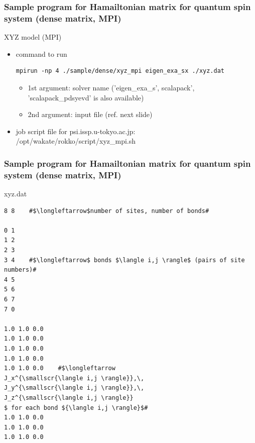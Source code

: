 \lstset{escapechar=\#}
  

\begin{frame}[c,fragile]
  \frametitle{Sample program for Hamailtonian matrix for quantum spin system (dense matrix, MPI)}

XYZ model (MPI) 
  \begin{itemize}
  \item command to run
\begin{lstlisting}[style=shstyle]
mpirun -np 4 ./sample/dense/xyz_mpi eigen_exa_sx ./xyz.dat
\end{lstlisting}
    \begin{itemize}
    \item 1st argument: solver name ('eigen_exa_s', scalapack', 'scalapack_pdsyevd' is also available) \\
    \item 2nd argument: input file (ref. next slide)
    \end{itemize}
  \item job script file for psi.issp.u-tokyo.ac.jp:  /opt/wakate/rokko/script/xyz_mpi.sh
  \end{itemize}
\end{frame}


\begin{frame}[c,fragile]
  \frametitle{Sample program for Hamailtonian matrix for quantum spin system (dense matrix, MPI)}
xyz.dat
\begin{lstlisting}[style=shstyle]
8 8    #$\longleftarrow$number of sites, number of bonds#

0 1
1 2
2 3
3 4    #$\longleftarrow$ bonds $\langle i,j \rangle$ (pairs of site numbers)#
4 5
5 6
6 7
7 0

1.0 1.0 0.0
1.0 1.0 0.0
1.0 1.0 0.0
1.0 1.0 0.0
1.0 1.0 0.0    #$\longleftarrow
J_x^{\smallscr{\langle i,j \rangle}},\, 
J_y^{\smallscr{\langle i,j \rangle}},\,
J_z^{\smallscr{\langle i,j \rangle}}
$ for each bond ${\langle i,j \rangle}$#
1.0 1.0 0.0
1.0 1.0 0.0
1.0 1.0 0.0
\end{lstlisting}
\end{frame}


